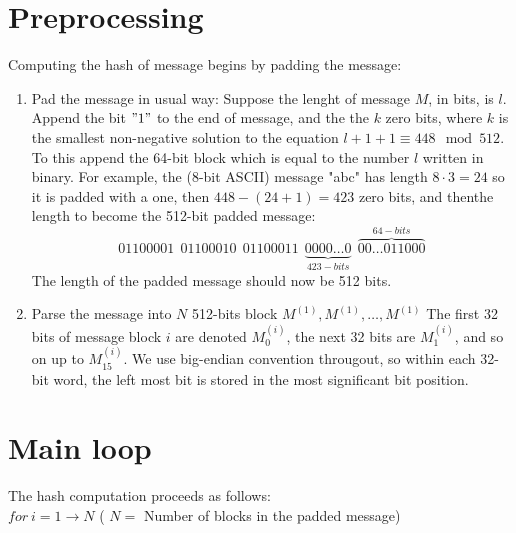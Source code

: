 \documentclass{report}
\begin{document}
\section{Preprocessing}
Computing the hash of message begins by padding the message: 
\begin{enumerate}
	\item{Pad the message in usual way:}
		Suppose the lenght of message $M$, in bits, is $l$. Append the bit $"1"$ to the end of message, and the the $k$ zero bits, where $k$ is the smallest non-negative solution to the equation $l + 1 + 1 \equiv 448 \mod 512$. To this append the 64-bit block which is equal to the number $l$ written in binary. For example, the (8-bit ASCII) message "abc" has length $8 \cdot 3 = 24$ so it is padded with a one, then $448 - (24 + 1) = 423$ zero bits, and thenthe length to become the 512-bit padded message: 
		\[ 01100001\ \ 01100010\ \ 01100011\ \ \underbrace{0000\ldots0}_{423-bits}\ \ \overbrace{00\ldots011000}^{64-bits} \]
		The length of the padded message should now be 512 bits.
	\item{Parse the message into $N$ 512-bits block $M^{(1)}, M^{(1)}, \ldots , M^{(1)}$}
		The first 32 bits of message block $i$ are denoted $M^{(i)}_{0}$, the next 32 bits are $M^{(i)}_{1}$, and so on up to $M^{(i)}_{15}$. We use big-endian convention througout, so within each 32-bit word, the left most bit is stored in the most significant bit position.
\end{enumerate}

\section{Main loop}
The hash computation proceeds as follows: \\
$for\ i = 1 \rightarrow N$ ( $N =$ Number of blocks in the padded message) 
\end{document}

